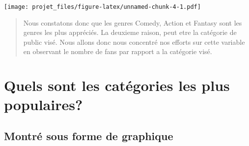 \documentclass[]{article}
\newenvironment{Shaded}{\begin{snugshade}}{\end{snugshade}}
\newcommand{\DataTypeTok}[1]{\textcolor[rgb]{0.13,0.29,0.53}{#1}}
\newcommand{\KeywordTok}[1]{\textcolor[rgb]{0.13,0.29,0.53}{\textbf{#1}}}
\newcommand{\NormalTok}[1]{#1}
\newcommand{\OperatorTok}[1]{\textcolor[rgb]{0.81,0.36,0.00}{\textbf{#1}}}
\newcommand{\StringTok}[1]{\textcolor[rgb]{0.31,0.60,0.02}{#1}}
\begin{document}
\texttt{[image: projet\_files/figure-latex/unnamed-chunk-4-1.pdf]}

\begin{quote}
Nous constatons donc que les genres Comedy, Action et Fantasy sont les
genres les plus appréciés. La deuxieme raison, peut etre la catégorie de
public visé. Nous allons donc nous concentré nos efforts sur cette
variable en observant le nombre de fans par rapport a la catégorie visé.
\end{quote}

\hypertarget{quels-sont-les-categories-les-plus-populaires}{%
\section{Quels sont les catégories les plus
populaires?}\label{quels-sont-les-categories-les-plus-populaires}}

\hypertarget{montre-sous-forme-de-graphique-2}{%
\subsection{Montré sous forme de
graphique}\label{montre-sous-forme-de-graphique-2}}

\begin{Shaded}
\end{Shaded}
\end{document}
